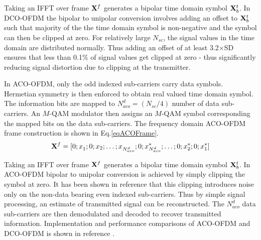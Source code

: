 Taking an IFFT over frame ${\bf{X}}^{f}$ generates a bipolar time domain symbol ${\bf{X}}_{b}^{t}$. In DCO-OFDM the bipolar to unipolar conversion involves adding an offset to ${\bf{X}}_{b}^{t}$ such that majority of the the time domain symbol is non-negative and the symbol can then be clipped at zero. For relatively large $N_{sc}$, the signal values in the time domain are distributed normally. Thus adding an offset of at least 3.2$\times$SD ensures that less than 0.1$\%$ of signal values get clipped at zero - thus significantly reducing signal distortion due to clipping at the transmitter.

In ACO-OFDM, only the odd indexed sub-carriers carry data symbols. Hermetian symmetry is then enforced to obtain real valued time domain symbol. The information bits are mapped to $N_{aco}^{d} = (N_{sc}/4)$ number of data sub-carriers. An $M$-QAM modulator then assigns an $M$-QAM symbol corresponding the mapped bits on the data sub-carriers. The frequency domain ACO-OFDM frame construction is shown in Eq.\eqref{eqACOFrame}. 
\begin{equation}
	{\bf{X}}^{f} = [0; x_{1}^{ }; 0; x_{2}; \ldots; x_{N_{aco}^{d}}^{ }; 0; x_{N_{aco}^{d}}^{*}; \ldots; 0; x_{2}^{*}; 0; x_{1}^{*}]
\label{eqACOFrame}
\end{equation}

Taking an IFFT over frame ${\bf{X}}^{f}$ generates a bipolar time domain symbol ${\bf{X}}_{b}^{t}$. In ACO-OFDM bipolar to unipolar conversion is achieved by simply clipping the symbol at zero. It has been shown in reference \cite{arm06a} that this clipping introduces noise only on the non-data bearing even indexed sub-carriers. Thus by simple signal processing, an estimate of transmitted signal can be reconstructed. The $N_{aco}^{d}$ data sub-carriers are then demodulated and decoded to recover transmitted information. Implementation and performance comparisons of ACO-OFDM and DCO-OFDM is shown in reference \cite{mes11a}.
